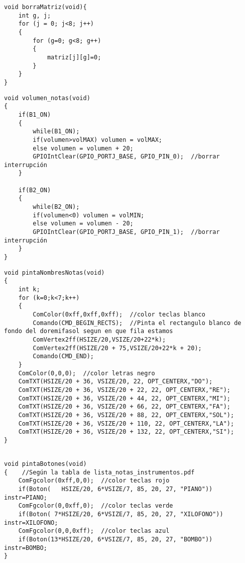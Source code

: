 \documentclass[12pt,a4paper]{article}
\begin{document}
\begin{lstlisting}[basicstyle=\footnotesize] 
void borraMatriz(void){
    int g, j;
    for (j = 0; j<8; j++)
    {
        for (g=0; g<8; g++)
        {
            matriz[j][g]=0;
        }
    }
}
\end{lstlisting}

\begin{lstlisting}[basicstyle=\footnotesize] 
void volumen_notas(void)
{
    if(B1_ON)
    {
        while(B1_ON);
        if(volumen>volMAX) volumen = volMAX;
        else volumen = volumen + 20;
        GPIOIntClear(GPIO_PORTJ_BASE, GPIO_PIN_0);  //borrar interrupción
    }

    if(B2_ON)
    {
        while(B2_ON);
        if(volumen<0) volumen = volMIN;
        else volumen = volumen - 20;
        GPIOIntClear(GPIO_PORTJ_BASE, GPIO_PIN_1);  //borrar interrupción
    }
}

\end{lstlisting}

\begin{lstlisting}[basicstyle=\footnotesize] 
void pintaNombresNotas(void)
{
    int k;
    for (k=0;k<7;k++)
    {
        ComColor(0xff,0xff,0xff);  //color teclas blanco
        Comando(CMD_BEGIN_RECTS);  //Pinta el rectangulo blanco de fondo del doremifasol segun en que fila estamos
        ComVertex2ff(HSIZE/20,VSIZE/20+22*k);
        ComVertex2ff(HSIZE/20 + 75,VSIZE/20+22*k + 20);
        Comando(CMD_END);
    }
    ComColor(0,0,0);  //color letras negro
    ComTXT(HSIZE/20 + 36, VSIZE/20, 22, OPT_CENTERX,"DO");
    ComTXT(HSIZE/20 + 36, VSIZE/20 + 22, 22, OPT_CENTERX,"RE");
    ComTXT(HSIZE/20 + 36, VSIZE/20 + 44, 22, OPT_CENTERX,"MI");
    ComTXT(HSIZE/20 + 36, VSIZE/20 + 66, 22, OPT_CENTERX,"FA");
    ComTXT(HSIZE/20 + 36, VSIZE/20 + 88, 22, OPT_CENTERX,"SOL");
    ComTXT(HSIZE/20 + 36, VSIZE/20 + 110, 22, OPT_CENTERX,"LA");
    ComTXT(HSIZE/20 + 36, VSIZE/20 + 132, 22, OPT_CENTERX,"SI");
}


\end{lstlisting}

\begin{lstlisting}[basicstyle=\footnotesize] 
void pintaBotones(void)
{    //Según la tabla de lista_notas_instrumentos.pdf
    ComFgcolor(0xff,0,0);  //color teclas rojo
    if(Boton(   HSIZE/20, 6*VSIZE/7, 85, 20, 27, "PIANO"))      instr=PIANO;
    ComFgcolor(0,0xff,0);  //color teclas verde
    if(Boton( 7*HSIZE/20, 6*VSIZE/7, 85, 20, 27, "XILOFONO"))   instr=XILOFONO;
    ComFgcolor(0,0,0xff);  //color teclas azul
    if(Boton(13*HSIZE/20, 6*VSIZE/7, 85, 20, 27, "BOMBO"))      instr=BOMBO;
}

\end{lstlisting}
\end{document}
